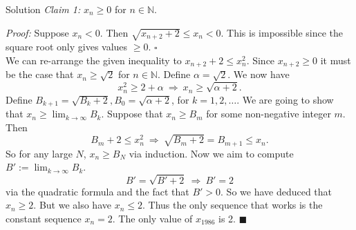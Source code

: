 \documentclass{article}
\begin{document}
\begin{solution}{Solution}
\textit{Claim 1:} $x_n \geq 0$ for $n \in \mathbb{N}$. \vspace{0.2cm}

\textit{Proof:} Suppose $x_n < 0$. Then $\sqrt{x_{n+2} + 2} \leq x_n < 0$.
This is impossible since the square root only gives values $\geq 0$.
$\square$ \\

We can re-arrange the given inequality to $x_{n+2} + 2 \leq x_n^2$.
Since $x_{n+2} \geq 0$ it must be the case that $x_n \geq \sqrt{2}$ for
$n \in \mathbb{N}$. Define $\alpha = \sqrt2$. We now have
$$
x_n^2 \geq 2 + \alpha \ \Rightarrow \ x_n \geq \sqrt{\alpha + 2}.
$$
Define $B_{k+1} = \sqrt{B_k + 2}, B_0 = \sqrt{\alpha + 2}$, for
$k = 1,2,\ldots$. We are going to show that
$x_n \geq \lim_{k \rightarrow \infty} B_k$.
Suppose that $x_n \geq B_m$ for some non-negative integer $m$. Then
$$
B_m + 2 \leq x_n^2 \ \Rightarrow \ \sqrt{B_m + 2} = B_{m+1} \leq x_n.
$$
So for any large $N$, $x_n \geq B_N$ via induction. Now we aim to compute
$B' := \lim_{k \rightarrow \infty} B_k$.
$$
B' = \sqrt{B' + 2} \ \Rightarrow \ B' = 2
$$
via the quadratic formula and the fact that $B' > 0$. So we have deduced
that $x_n \geq 2$. But we also have $x_n \leq 2$. Thus the only sequence
that works is the constant sequence $x_n = 2$. The only value of $x_{1986}$
is 2. $\blacksquare$
\end{solution}
\end{document}

